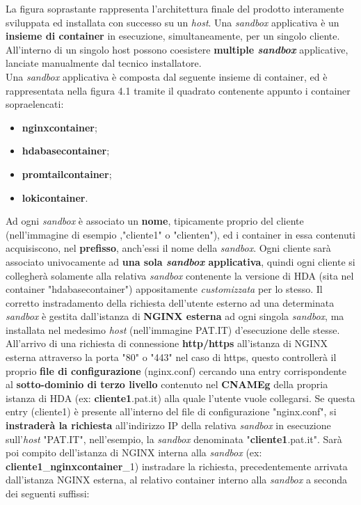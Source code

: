 La figura soprastante rappresenta l'architettura finale del prodotto interamente sviluppata ed installata con successo su un \textit{host}. 
Una \textit{sandbox} applicativa è un \textbf{insieme di container} in esecuzione, simultaneamente, per un singolo cliente. All'interno di un singolo host possono coesistere \textbf{multiple \textit{sandbox}} applicative, lanciate manualmente dal tecnico installatore.\\
Una \textit{sandbox} applicativa è composta dal seguente insieme di container, ed è rappresentata nella figura 4.1 tramite il quadrato contenente appunto i container sopraelencati:
\begin{itemize}
	\item \textbf{nginxcontainer};
	\item \textbf{hdabasecontainer};
	\item \textbf{promtailcontainer};
	\item \textbf{lokicontainer}.
\end{itemize}
Ad ogni \textit{sandbox} è associato un \textbf{nome}, tipicamente proprio del cliente (nell'immagine di esempio ,"cliente1" o "clienten"), ed i container in essa contenuti acquisiscono, nel \textbf{prefisso}, anch'essi il nome della \textit{sandbox}. Ogni cliente sarà associato univocamente ad \textbf{una sola \textit{sandbox} applicativa}, quindi ogni cliente si collegherà solamente alla relativa \textit{sandbox} contenente la versione di HDA (sita nel container "hdabasecontainer") appositamente \textit{customizzata} per lo stesso.
Il corretto instradamento della richiesta dell'utente esterno ad una determinata \textit{sandbox} è gestita dall'istanza di \textbf{NGINX esterna} ad ogni singola \textit{sandbox}, ma installata nel medesimo \textit{host} (nell'immagine PAT.IT) d'esecuzione delle stesse. \\
All'arrivo di una richiesta di connessione \textbf{http/https} all'istanza di NGINX esterna attraverso la porta "80" o "443" nel caso di https, questo controllerà il proprio \textbf{file di configurazione} (nginx.conf) cercando una entry corrispondente al \textbf{sotto-dominio di terzo livello} contenuto nel \textbf{\gls{CNAMEg}} della propria istanza di HDA (ex: \textbf{cliente1}.pat.it) alla quale l'utente vuole collegarsi. Se questa entry (cliente1) è presente all'interno del file di configurazione "nginx.conf", si \textbf{instraderà la richiesta} all'indirizzo IP della relativa \textit{sandbox} in esecuzione sull'\textit{host} "PAT.IT", nell'esempio, la \textit{sandbox} denominata "\textbf{cliente1}.pat.it". Sarà poi compito dell'istanza di NGINX interna alla \textit{sandbox} (ex: \textbf{cliente1}\_\textbf{nginxcontainer}\_1) instradare la richiesta, precedentemente arrivata dall'istanza NGINX esterna, al relativo container interno alla \textit{sandbox} a seconda dei seguenti suffissi:
